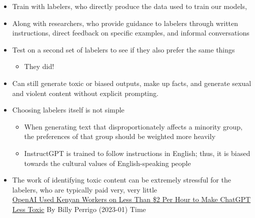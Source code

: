 \documentclass[25pt,a4paper,landscape,headrule,footrule,xetex]{foils}
\begin{document}
\begin{itemize}
\item Train with labelers, who directly produce the data used to train our models,
\item Along with  researchers, who provide guidance to labelers through written instructions, direct feedback on specific examples, and informal conversations
\item Test on a second set of labelers to see if they also prefer the same things
  \begin{itemize}
  \item They did!
  \end{itemize}

\end{itemize}


\begin{itemize}
\item  Can still generate toxic or biased outputs, make up facts, and generate sexual and violent content without explicit prompting. 
\item Choosing labelers itself is not simple
  \begin{itemize}
  \item When generating text that disproportionately affects a minority group, the preferences of that group should be weighted more heavily
  \item InstructGPT is trained to follow instructions in English;
    thus, it is biased towards the cultural values of English-speaking
    people
  \end{itemize}
\item The work of identifying toxic content can be extremely stressful
  for the labelers, who are typically paid very, very little
  \\ {\small \href{https://time.com/6247678/openai-chatgpt-kenya-workers/}{OpenAI Used Kenyan Workers on Less Than \$2 Per Hour to Make ChatGPT Less Toxic} By Billy Perrigo (2023-01) Time }
\end{itemize}
\end{document}
